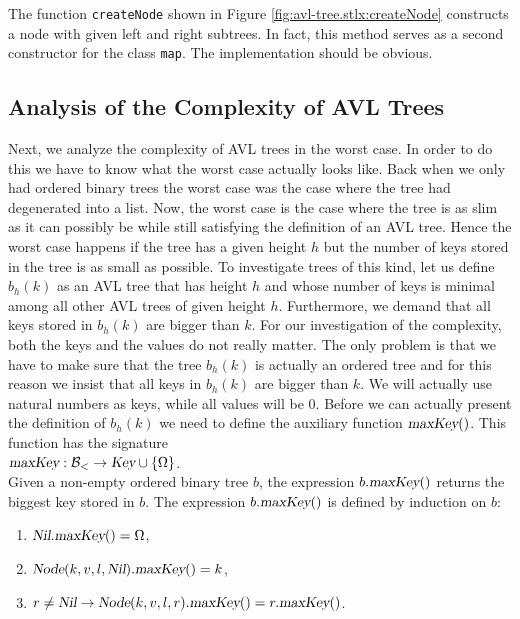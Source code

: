 The function \texttt{createNode} shown in Figure \ref{fig:avl-tree.stlx:createNode}
constructs a node with given left and right subtrees.  In fact, this method serves as a second
constructor for the class \texttt{map}.  The implementation should be obvious.


\subsection{Analysis of the Complexity of AVL Trees}
Next, we analyze the complexity of AVL trees in the worst case.  In order to do this we have to know
what the worst case actually looks like.  Back when we only had ordered binary trees the worst case was the case where
the tree had degenerated into a list.  Now, the worst case is the case where the tree is as slim as
it can possibly be while still satisfying the definition of an AVL tree.  Hence the worst case
happens if the tree has a given height $h$ but the number of keys stored in the tree is as small as
possible.  To investigate trees of this kind, let us define  $b_h(k)$ as an AVL tree that has height
$h$ and whose number of keys is minimal among all other AVL trees of given  height $h$.  Furthermore,
we demand that all keys stored in  $b_h(k)$ are bigger than  $k$.  For our investigation of the
complexity, both the keys and the values do not really matter.  The only problem is that we have to
make sure that the tree $b_h(k)$ is actually an ordered tree and for this reason we insist that all
keys in $b_h(k)$ are bigger than $k$.  We will actually use natural numbers as keys, while all
values will be $0$.
Before we can actually present the definition of  $b_h(k)$ we need to define the auxiliary function
 $\textsl{maxKey}()$.  This function has the signature 
\\[0.2cm]
\hspace*{1.3cm}
$\textsl{maxKey}:\mathcal{B}_< \rightarrow \textsl{Key} \cup \{ \Omega \}$.
\\[0.2cm]
Given a non-empty ordered binary tree  $b$, the expression $b.\textsl{maxKey}()$ returns the biggest
key stored in $b$.  The expression  $b.\textsl{maxKey}()$ is defined by induction on $b$:
\begin{enumerate}
\item $\textsl{Nil}.\textsl{maxKey}() = \Omega$,
\item $\textsl{Node}(k,v,l,\textsl{Nil}).\textsl{maxKey}() = k$,
\item $r \not= \textsl{Nil} \rightarrow \textsl{Node}(k,v,l,r).\textsl{maxKey}() = r.\textsl{maxKey}()$.
\end{enumerate}
